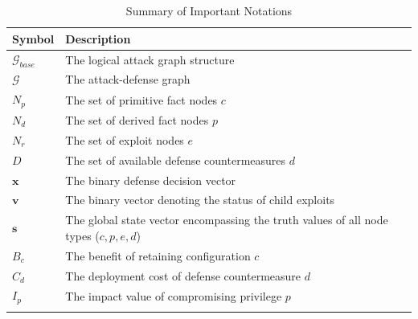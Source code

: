 \documentclass[conference]{IEEEtran}
\theoremstyle{definition} %
\theoremstyle{plain} %
\begin{document}
\begin{table}[htbp]
    \centering
    \renewcommand{\arraystretch}{1.3} 
    \caption{Summary of Important Notations}
    \label{tab:notations}
    
    \begin{tabular}{p{} p{}}
        \toprule
        \textbf{Symbol} & \textbf{Description} \\
        \midrule
        
        $\mathcal{G}_{base}$ & The logical attack graph structure \\
        $\mathcal{G}$        & The attack-defense graph \\
        $N_p$                & The set of primitive fact nodes $c$ \\
        $N_d$                & The set of derived fact nodes $p$ \\
        $N_r$                & The set of exploit nodes $e$ \\
        $D$                  & The set of available defense countermeasures $d$ \\
        
        \addlinespace %
        
        $\mathbf{x}$         & The binary defense decision vector \\
        $\mathbf{v}$ & The binary vector denoting the status of child exploits \\
        $\mathbf{s}$         & The global state vector encompassing the truth values of all node types ($c, p, e, d$) \\
        
        \addlinespace %
        
        $B_c$                & The benefit of retaining configuration $c$ \\
        $C_d$                & The deployment cost of defense countermeasure $d$ \\
        $I_p$                & The impact value of compromising privilege $p$ \\
        
        \addlinespace %
        

\end{tabular}
\end{table}
\end{document}
